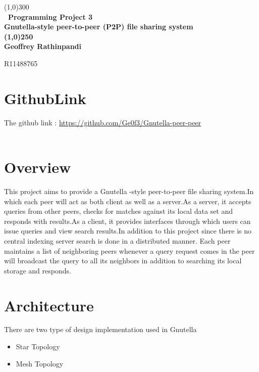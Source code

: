 \documentclass{article}
\begin{document}
\begin{titlepage}
	\begin{center}
	\line(1,0){300}\\
	[0.25in]
	\huge\bfseries\ Programming Project 3 \\Gnutella-style peer-to-peer (P2P) file sharing system \\
	
	
	\line(1,0){250}\\
	\bfseries {Geoffrey Rathinpandi}\\
	\end{center}
	
	

	\begin{flushright}
	\textsc{R11488765}\\
	
	
	\end{flushright}
	\tableofcontents
\end{titlepage}
\section{GithubLink}
The github link :  \url{https://github.com/Ge0f3/Gnutella-peer-peer } \\ \\

\section{Overview}

This project aims to provide a Gnutella -style peer-to-peer file sharing system.In which each peer will act as both client as well as a server.As a server, it accepts queries from other peers, checks for matches against its local data set and responds with results.As a client, it provides interfaces through which users can issue queries and view search results.In addition to this project since there is no central indexing server search is done in a distributed manner. Each peer maintains a list of neighboring peers whenever a query request comes in the peer will broadcast the query to all its neighbors in addition to searching its local storage and responds.


\section{Architecture}

There are two type of design implementation used in Gnutella  \\
\begin{itemize}
\item Star Topology
\item Mesh Topology
\end{itemize}
\end{document}
